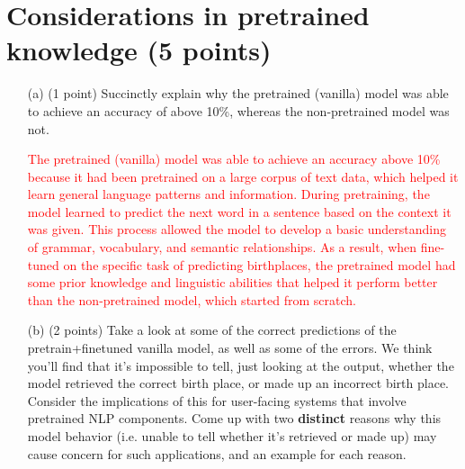 \documentclass[letterpaper,12pt]{article}
\begin{document}
	
	\section{Considerations in pretrained knowledge (5 points)}
	
	\begin{itemize}
		\item[(a)]
			(1 point) Succinctly explain why the pretrained (vanilla) model was able to achieve an accuracy of above 10\%, whereas the non-pretrained model was not.
			
			\textcolor{red}{ The pretrained (vanilla) model was able to achieve an accuracy above 10\% because it had been pretrained on a large corpus of text data, which helped it learn general language patterns and information. During pretraining, the model learned to predict the next word in a sentence based on the context it was given. This process allowed the model to develop a basic understanding of grammar, vocabulary, and semantic relationships. As a result, when fine-tuned on the specific task of predicting birthplaces, the pretrained model had some prior knowledge and linguistic abilities that helped it perform better than the non-pretrained model, which started from scratch.}
		\item[(b)]
			(2 points) Take a look at some of the correct predictions of the pretrain+finetuned vanilla model, as well as some of the errors. We think you'll find that it's impossible to tell, just looking at the output, whether the model retrieved the correct birth place, or made up an incorrect birth place. Consider the implications of this for user-facing systems that involve pretrained NLP components. Come up with two \textbf{distinct} reasons why this model behavior (i.e. unable to tell whether it's retrieved or made up) may cause concern for such applications, and an example for each reason.
			

\end{itemize}
\end{document}
